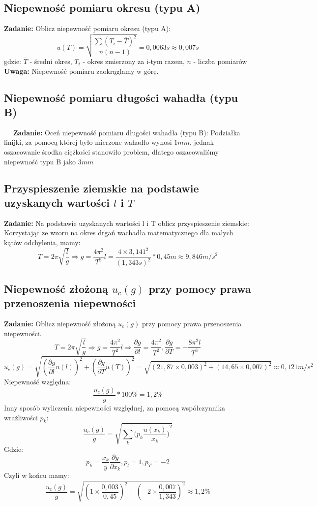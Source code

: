 \documentclass[18pt, twoside]{article}
\begin{document}
\subsection{Niepewność pomiaru okresu (typu A)}
\textbf{Zadanie:} Oblicz niepewność pomiaru okresu (typu A): \newline
\[u(T) =\sqrt{\frac{\sum{(T_i - \overline T)^2}}{n(n-1)}} = 0,0063s \approx 0,007s \] gdzie:  \(\overline T\) - średni okres, \(T_i\) - okres zmierzony za i-tym razem, \(n\) - liczba pomiarów     \newline
\textbf{Uwaga:} Niepewność pomiaru zaokrąglamy w górę.
\subsection{Niepewność pomiaru długości wahadła (typu B)}
   \textbf{Zadanie:} Oceń niepewność pomiaru długości wahadła (typu B):\newline 
Podziałka linijki, za pomocą której było mierzone wahadło wynosi \(1mm\), jednak oszacowanie środka ciężkości stanowiło problem,  dlatego oszacowaliśmy niepewność typu B jako \(3mm\)
    
\subsection{Przyspieszenie ziemskie  na podstawie uzyskanych wartości \(l\) i \(T\)}
\textbf{Zadanie:} Na podstawie uzyskanych wartości l i T oblicz przyspieszenie ziemskie:\newline
Korzystając ze wzoru na okres drgań wachadła matematycznego dla małych kątów odchylenia, mamy: \[T = 2\pi \sqrt{\frac{l}{g}} \Rightarrow g = \frac{4\pi^2}{T^2}l = \frac{4 \times 3,141^2}{(1,343s)^2} * 0,45m  \approx 9,846 m/s^2\]
    
\subsection{Niepewność złożoną \(u_c(g)\) przy pomocy prawa przenoszenia niepewności}
\textbf{Zadanie:} Oblicz niepewność złożoną \(u_c(g)\) przy pomocy prawa przenoszenia niepewności. \newline
\[T = 2\pi \sqrt{\frac{l}{g}} \Rightarrow g = \frac{4\pi^2}{T^2}l  \Rightarrow \frac{\partial g}{\partial l} = \frac{4\pi^2}{T^2},\frac{\partial g}{\partial T} = -\frac{8\pi^2l}{T^3} \]
\[u_c(g) = \sqrt{(\frac{\partial g}{\partial l} u(l))^2 + (\frac{\partial g}{\partial T} u(T))^2} = 
	\sqrt{(21,87\times0,003)^2 + (14,65\times0,007)^2}
	\approx 0,121 m/s^2\]
	Niepewność względna:
	\[\frac{u_c(g)}{g} * 100\% = 1,2\% \]
	Inny sposób wyliczenia niepewności względnej, za pomocą współczynnika wrażliwości \(p_k\):
	\[\frac{u_c(g)}{g} = \sqrt{\sum_k ({p_k \frac{u(x_k)}{x_k})}^2}\]
	Gdzie: \[p_k = \frac{x_k}{y} \frac{\partial y}{\partial x_k} , p_l = 1 , p_T = -2\] 
	Czyli w końcu mamy:
	\[ \frac{u_c(g)}{g} = \sqrt{(1\times \frac{0,003}{0,45})^2 +(-2\times \frac{0,007}{1,343})^2 } \approx 1,2 \%\]
\end{document}
